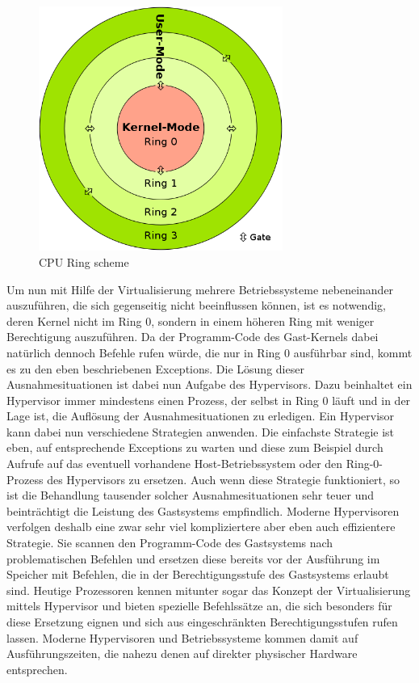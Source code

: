 \begin{figure}[!ht]
  \begin{center}
    \includegraphics[width=8cm]{bilder/500px-CPU_ring_scheme.png}
    \caption{CPU Ring scheme \citep{wiki:006}}
    \label{ringe}
  \end{center}
\end{figure}

Um nun mit Hilfe der Virtualisierung mehrere Betriebssysteme nebeneinander auszuführen, die sich gegenseitig nicht beeinflussen können, ist es notwendig, deren Kernel nicht im Ring 0, sondern in einem höheren Ring mit weniger Berechtigung auszuführen. Da der Programm-Code des Gast-Kernels dabei natürlich dennoch Befehle rufen würde, die nur in Ring 0 ausführbar sind, kommt es zu den eben beschriebenen Exceptions. Die Lösung dieser Ausnahmesituationen ist dabei nun Aufgabe des Hypervisors. Dazu beinhaltet ein Hypervisor immer mindestens einen Prozess, der selbst in Ring 0 läuft und in der Lage ist, die Auflösung der Ausnahmesituationen zu erledigen. Ein Hypervisor kann dabei nun verschiedene Strategien anwenden. Die einfachste Strategie ist eben, auf entsprechende Exceptions zu warten und diese zum Beispiel durch Aufrufe auf das eventuell vorhandene Host-Betriebssystem oder den Ring-0-Prozess des Hypervisors zu ersetzen. Auch wenn diese Strategie funktioniert, so ist die Behandlung tausender solcher Ausnahmesituationen sehr teuer und beinträchtigt die Leistung des Gastsystems empfindlich. Moderne Hypervisoren verfolgen deshalb eine zwar sehr viel kompliziertere aber eben auch effizientere Strategie. Sie scannen den Programm-Code des Gastsystems nach problematischen Befehlen und ersetzen diese bereits vor der Ausführung im Speicher mit Befehlen, die in der Berechtigungsstufe des Gastsystems erlaubt sind. Heutige Prozessoren kennen mitunter sogar das Konzept der Virtualisierung mittels Hypervisor und bieten spezielle Befehlssätze an, die sich besonders für diese Ersetzung eignen und sich aus eingeschränkten Berechtigungsstufen rufen lassen. Moderne Hypervisoren und Betriebssysteme kommen damit auf Ausführungszeiten, die nahezu denen auf direkter physischer Hardware entsprechen.

